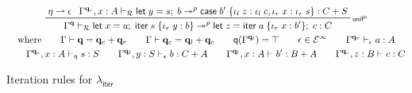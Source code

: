 \documentclass[acmsmall,screen,review]{acmart}
\newcommand{\mc}[1]{\ensuremath{\mathcal{#1}}}
\newcommand{\mb}[1]{\ensuremath{\mathbf{#1}}}
\newcommand{\ms}[1]{\ensuremath{\mathsf{#1}}}
\newcommand{\lto}{:}
\newcommand{\linl}[1]{\iota_l\;{#1}}
\newcommand{\linr}[1]{\iota_r\;{#1}}
\newcommand{\letexpr}[3]{\ensuremath{\ms{let}\;#1 = #2;\;#3}}
\newcommand{\caseexpr}[5]{\ms{case}\;#1\;\{\linl{#2} \lto #3, \linr{#4} \lto #5\}}
\newcommand{\liter}[3]{\ms{iter}\;#1\;\{ \linr{#2} \lto #3 \}}
\newcommand{\einf}[1]{#1 \in \mc{E}^\infty}
\newcommand{\qsp}[4]{#1 \vdash #2 = #3 + #4}
\newcommand{\rle}[1]{{\scriptsize\textsf{#1}}}
\newcommand{\hasty}[4]{#1 \vdash_{#2} #3: {#4}}
\newcommand{\tref}{\twoheadrightarrow}
\newcommand{\tmlep}[6]{#1 \vdash_{#2} #3 \tref^{#6} #4 : {#5}}
\newcommand{\subiterexp}{\texorpdfstring{\(\lambda_{\ms{iter}}\)}{lambda-iter}}
\newcommand{\rightmove}{\rightharpoonup}
\newcommand{\alquant}{\ms{q}}
\begin{document}
\begin{figure}
\begin{adjustbox}{minipage=1.1\textwidth,scale=0.9}
  \begin{gather*}
    \prftree[r]{\rle{unif$^p$}}
      {\eta \rightmove \epsilon}
      {\tmlep{\Gamma^{\mb{q}_c}, x : A}{\mc{R}}
        {\letexpr{y}{s}{b}}
        {\caseexpr{b'}{z}{\linl{c}}{x}{\linr{s}}}{C + S}{p}}
      {
        \tmlep{\Gamma^{\mb{q}}}
          {\mc{R}}
          {\letexpr{x}{a}{\liter{s}{y}{b}}}
          {\letexpr{z}{\liter{a}{x}{b'}}{c}}
          {C}
          {p}
      } \\
    \text{where} \qquad {\qsp{\Gamma}{\mb{q}}{\mb{q}_c}{\mb{q}_r}} \qquad
    {\qsp{\Gamma}{\mb{q}_c}{\mb{q}_l}{\mb{q}_c}} \qquad
    \alquant(\Gamma^{\mb{q}_l}) = \top \qquad
    \einf{\epsilon} \qquad
    {\hasty{\Gamma^{\mb{q}_r}}{\epsilon}{a}{A}}
    \\
    \qquad {\hasty{\Gamma^{\mb{q}_c}, x : A}{\eta}{s}{S}}
    \qquad {\hasty{\Gamma^{\mb{q}_l}, y : S}{\epsilon}{b}{C + A}}
    \qquad {\hasty{\Gamma^{\mb{q}_l}, x : A}{}{b'}{B + A}}
    \qquad {\hasty{\Gamma^{\mb{q}_c}, z : B}{}{c}{C}}
  \end{gather*} 
  \end{adjustbox}
  \caption{Iteration rules for \subiterexp{}}
  \Description{}
  \label{fig:iteration-rules}
\end{figure}
\end{document}

